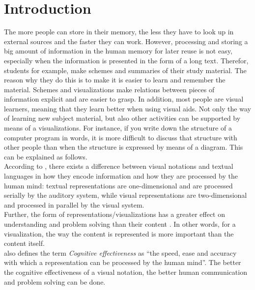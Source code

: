 \chapter{Introduction}\label{ch:introduction}

The more people can store in their memory, the less they have to look up in external sources and the faster they can work. However, processing and storing a big amount of information in the human memory for later reuse is not easy, especially when the information is presented in the form of a long text. Therefor, students for example, make schemes and summaries of their study material. The reason why they do this is to make it is easier to learn and remember the material. Schemes and visualizations make relations between pieces of information explicit and are easier to grasp. In addition, most people are visual learners, meaning that they learn better when using visual aids. Not only the way of learning new subject material, but also other activities can be supported by means of a visualizations. For instance, if you write down the structure of a computer program in words, it is more difficult to discuss that structure with other people than when the structure is expressed by means of a diagram. This can be explained as follows.\\

According to \cite{moody-physicsofnotations-2009}, there exists a difference between visual notations and textual languages in how they encode information and how they are processed by the human mind: textual representations are one-dimensional and are processed serially by the auditory system, while visual representations are two-dimensional and processed in parallel by the visual system.\\

Further, the form of representations/visualizations has a greater effect on understanding and problem solving than their content \citep{moody-innsbruck-2012}. In other words, for a visualization, the way the content is represented is more important than the content itself.\\

\cite{moody-physicsofnotations-2009} also defines the term \textit{Cognitive effectiveness} as ``the speed, ease and accuracy with which a representation can be processed by the human mind''. The better the cognitive effectiveness of a visual notation, the better human communication and problem solving can be done.\\

